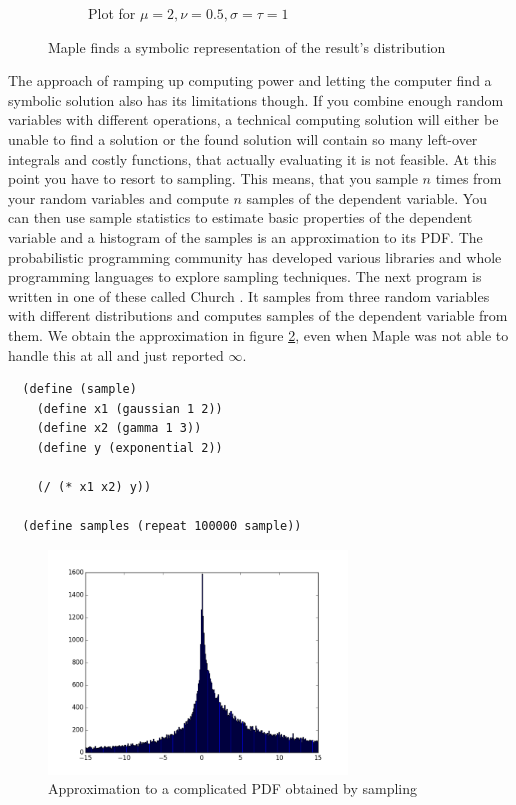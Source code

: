 \documentclass[11pt,a4paper]{book}
\begin{document}
\begin{figure}
\begin{subfigure}{0.45\textwidth}
    \caption{Plot for $\mu = 2, \nu = 0.5, \sigma = \tau = 1$}
  \end{subfigure}
  \caption{Maple finds a symbolic representation of the result's distribution}
  \label{fig:intro-maple-pdf}
\end{figure}

The approach of ramping up computing power and letting the computer find a
symbolic solution also has its limitations though. If you combine enough random
variables with different operations, a technical computing solution will either
be unable to find a solution or the found solution will contain so many
left-over integrals and costly functions, that actually evaluating it is not
feasible. At this point you have to resort to sampling. This means, that you
sample $n$ times from your random variables and compute $n$ samples of the
dependent variable. You can then use sample statistics to estimate basic
properties of the dependent variable and a histogram of the samples is an
approximation to its PDF. The probabilistic programming community \cite{ppl} has
developed various libraries and whole programming languages to explore sampling
techniques. The next program is written in one of these called Church
\cite{church}. It samples from three random variables with different
distributions and computes samples of the dependent variable from them. We
obtain the approximation in figure \ref{fig:church-pdf}, even when Maple was not
able to handle this at all and just reported $\infty$.
\begin{verbatim}
  (define (sample)
    (define x1 (gaussian 1 2))
    (define x2 (gamma 1 3))
    (define y (exponential 2))

    (/ (* x1 x2) y))

  (define samples (repeat 100000 sample))
\end{verbatim}
\begin{figure}[h]
  \centering
  \includegraphics[width=300px]{thesis/introduction/church-pdf}
  \caption{Approximation to a complicated PDF obtained by sampling}
  \label{fig:church-pdf}
\end{figure}
\end{document}
